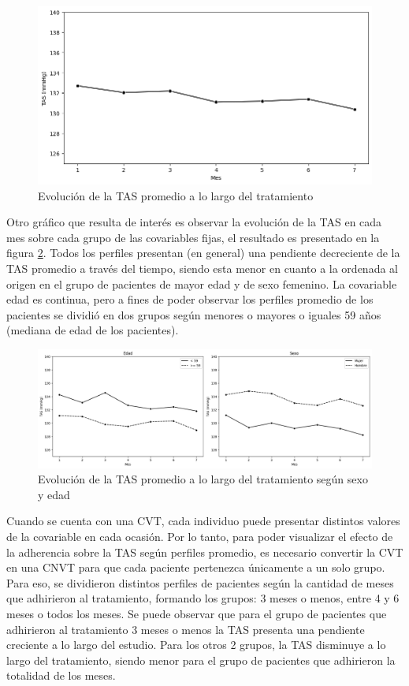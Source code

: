 \documentclass[spanish]{article}
\numberwithin{figure}{subsection}
\numberwithin{equation}{subsection}
\numberwithin{table}{subsection}
\begin{document}
\begin{figure}[H]
	\centering
	\includegraphics[scale=0.5]{img/TAS_vs_tpo.png}
	\caption{Evolución de la TAS promedio a lo largo del tratamiento}
	\label{TAS_vs_tpo}
\end{figure}

Otro gráfico que resulta de interés es observar la evolución de la TAS en cada
mes sobre cada grupo de las covariables fijas, el resultado es presentado en la
figura \ref{TAS_with_covs}. Todos los perfiles presentan (en general) una
pendiente decreciente de la TAS promedio a través del tiempo, siendo esta menor
en cuanto a la ordenada al origen en el grupo de pacientes de mayor edad y de
sexo femenino. La covariable edad es continua, pero a fines de poder observar
los perfiles promedio de los pacientes se dividió en dos grupos según menores o
mayores o iguales 59 años (mediana de edad de los pacientes).

\begin{figure}[H]
	\centering
	\includegraphics[scale=0.4]{img/TAS_vs_tpo_with_covs.png}
	\caption{Evolución de la TAS promedio a lo largo del tratamiento según sexo y edad}
	\label{TAS_with_covs}
\end{figure}

Cuando se cuenta con una CVT, cada individuo puede presentar distintos valores
de la covariable en cada ocasión. Por lo tanto, para poder visualizar el efecto
de la adherencia sobre la TAS según perfiles promedio, es necesario convertir la
CVT en una CNVT para que cada paciente pertenezca únicamente a un solo grupo.
Para eso, se dividieron distintos perfiles de pacientes según la cantidad de
meses que adhirieron al tratamiento, formando los grupos: 3 meses o menos, entre
4 y 6 meses o todos los meses. Se puede observar que para el grupo de pacientes
que adhirieron al tratamiento 3 meses o menos la TAS presenta una pendiente
creciente a lo largo del estudio. Para los otros 2 grupos, la TAS disminuye a lo
largo del tratamiento, siendo menor para el grupo de pacientes que adhirieron la
totalidad de los meses.
\end{document}
